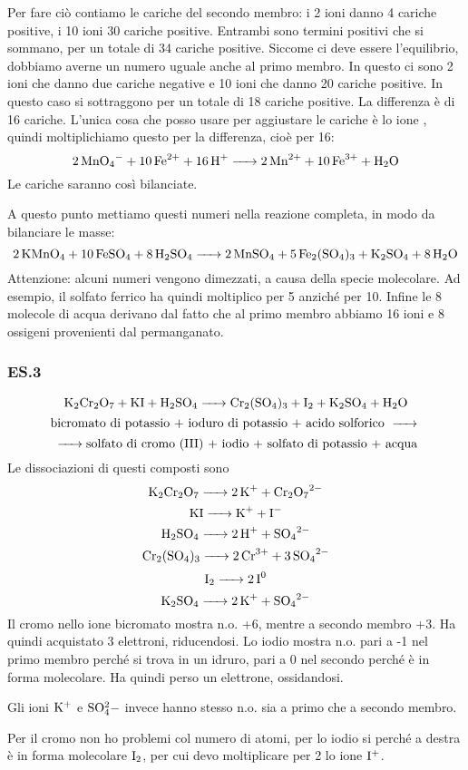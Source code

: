 Per fare ciò contiamo le cariche del secondo membro: i 2 ioni  danno 4 cariche positive, i 10 ioni  30 cariche positive. Entrambi sono termini positivi che si sommano, per un totale di 34 cariche positive. Siccome ci deve essere l'equilibrio, dobbiamo averne un numero uguale anche al primo membro. In questo ci sono 2 ioni  che danno due cariche negative e 10 ioni  che danno 20 cariche positive. In questo caso si sottraggono per un totale di 18 cariche positive. La differenza è di 16 cariche. L'unica cosa che posso usare per aggiustare le cariche è lo ione , quindi moltiplichiamo questo per la differenza, cioè per 16:
$$\ce{2MnO_4- + 10Fe^2+ + 16H+ -> 2Mn^2+ + 10Fe^3+ + H_2O}$$
Le cariche saranno così bilanciate.

A questo punto mettiamo questi numeri nella reazione completa, in modo da bilanciare le masse:
$$\ce{2KMnO_4 + 10FeSO_4 + 8H_2SO_4 -> 2MnSO_4 + 5Fe_2(SO_4)_3 + K_2SO_4 + 8H_2O}$$
Attenzione: alcuni numeri vengono dimezzati, a causa della specie molecolare. Ad esempio, il solfato ferrico ha  quindi moltiplico per 5 anziché per 10. Infine le 8 molecole di acqua derivano dal fatto che al primo membro abbiamo 16 ioni  e 8 ossigeni provenienti dal permanganato.\\
\subsubsection{\textbf{ES.3}}
$$\ce{K_2Cr_2O_7 + KI + H_2SO_4 -> Cr_2(SO_4)_3 + I_2 + K_2SO_4 + H_2O}$$
$$\text{bicromato di potassio + ioduro di potassio + acido solforico \ce{->}}$$
$${\ce{->} \text{solfato di cromo (III) +  iodio + solfato di potassio + acqua}}$$
Le dissociazioni di questi composti sono
$$\ce{K_2Cr_2O_7 -> 2K^+ + Cr_2O_7^2-}$$ 
$$\ce{KI -> K+ + I-}$$
$$\ce{H_2SO_4 -> 2H+ + SO_4^2-}$$
$$\ce{Cr_2(SO_4)_3 -> 2Cr^3+ + 3SO_4^2-}$$
$$\ce{I_2 -> 2I^0}$$
$$\ce{K_2SO_4 -> 2K+ + SO_4^2-}$$
Il cromo nello ione bicromato mostra n.o. +6, mentre a secondo membro +3. Ha quindi acquistato 3 elettroni, riducendosi.
Lo iodio mostra n.o. pari a -1 nel primo membro perché si trova in un idruro, pari a 0 nel secondo perché è in forma molecolare. Ha quindi perso un elettrone, ossidandosi. 

Gli ioni $\rm K^+$ e $\rm SO_4^2-$ invece hanno stesso n.o. sia a primo che a secondo membro.

Per il cromo non ho problemi col numero di atomi, per lo iodio si perché a destra è in forma molecolare $\rm I_2$, per cui devo moltiplicare per 2 lo ione $\rm I^+$.

